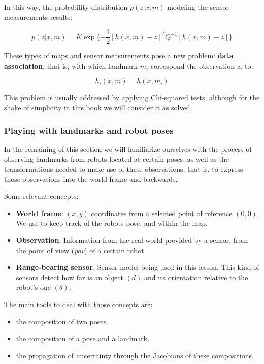 \documentclass[11pt]{article}
\providecommand{\tightlist}{%
      \setlength{\itemsep}{0pt}\setlength{\parskip}{0pt}}
\begin{document}
In this way, the probability distribution \(p(z|x,m)\) modeling the
sensor measurements results:

\[
p(z|x,m) = K \exp\{-\frac{1}{2}[h(x,m)-z]^T Q^{-1} [h(x,m)-z]\}
\]

These types of maps and sensor measurements pose a new problem:
\textbf{data association}, that is, with which landmark \(m_i\)
correspond the observation \(z_i\) to:

\[h_i(x,m)=h(x,m_i)\]

This problem is usually addressed by applying Chi-squared tests,
although for the shake of simplicity in this book we will consider it as
solved.

    \hypertarget{playing-with-landmarks-and-robot-poses}{%
\subsubsection{Playing with landmarks and robot
poses}\label{playing-with-landmarks-and-robot-poses}}

In the remaining of this section we will familiarize ourselves with the
process of observing landmarks from robots located at certain poses, as
well as the transformations needed to make use of these observations,
that is, to express those observations into the world frame and
backwards.

Some relevant concepts:

\begin{itemize}
\tightlist
\item
  \textbf{World frame}: \((x, y)\) coordinates from a selected point of
  reference \((0, 0)\). We use to keep track of the robots pose, and
  within the map.
\item
  \textbf{Observation}: Information from the real world provided by a
  sensor, from the point of view (\emph{pov}) of a certain robot.
\item
  \textbf{Range-bearing sensor}: Sensor model being used in this lesson.
  This kind of sensors detect how far is an object \((d)\) and its
  orientation relative to the robot's one \((\theta)\).
\end{itemize}

The main tools to deal with those concepts are:

\begin{itemize}
\tightlist
\item
  the composition of two poses.
\item
  the composition of a pose and a landmark.
\item
  the propagation of uncertainty through the Jacobians of these
  compositions.
\end{itemize}
\end{document}
